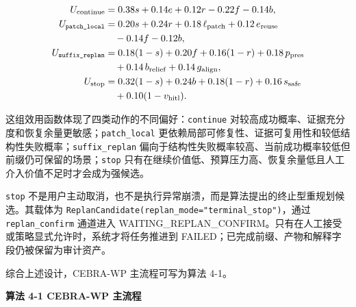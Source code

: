 \begin{align}
U_{\mathrm{continue}}
  &=0.38s+0.14e+0.12r-0.22f-0.14b,\\
U_{\text{\texttt{patch\_local}}}
  &=0.20s+0.24r+0.18\,\ell_{\mathrm{patch}}
    +0.12\,e_{\mathrm{reuse}}\notag\\
  &\quad{}-0.14f-0.12b,\\
U_{\text{\texttt{suffix\_replan}}}
  &=0.18(1-s)+0.20f+0.16(1-r)
    +0.18\,p_{\mathrm{pres}}\notag\\
  &\quad{}+0.14\,b_{\mathrm{relief}}
    +0.14\,g_{\mathrm{align}},\\
U_{\mathrm{stop}}
  &=0.32(1-s)+0.24b+0.18(1-r)
    +0.16\,s_{\mathrm{safe}}\notag\\
  &\quad{}+0.10(1-v_{\mathrm{hitl}}).
\end{align}

\begin{symboldefs}
\end{symboldefs}

这组效用函数体现了四类动作的不同偏好：\texttt{continue}
对较高成功概率、证据充分度和恢复余量更敏感；\texttt{patch\_local}
更依赖局部可修复性、证据可复用性和较低结构性失败概率；\texttt{suffix\_replan}
偏向于结构性失败概率较高、当前成功概率较低但前缀仍可保留的场景；\texttt{stop}
只有在继续价值低、预算压力高、恢复余量低且人工介入价值不足时才会成为强候选。

\texttt{stop}
不是用户主动取消，也不是执行异常崩溃，而是算法提出的终止型重规划候选。其载体为
\texttt{ReplanCandidate(replan\_mode="terminal\_stop")}，通过
\texttt{replan\_confirm} 通道进入
WAITING\_REPLAN\_CONFIRM。只有在人工接受或策略显式允许时，系统才将任务推进到
FAILED；已完成前缀、产物和解释字段仍被保留为审计资产。

综合上述设计，CEBRA-WP 主流程可写为算法 4-1。

\textbf{算法 4-1 CEBRA-WP 主流程}

